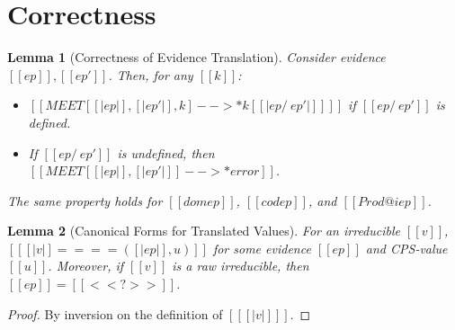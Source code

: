 \documentclass[11pt]{article}
\newtheorem{lemma}{Lemma}[section]
\begin{document}
\section{Correctness}

\begin{lemma}[Correctness of Evidence Translation]
	\label{lem:ev-correct}
	Consider evidence $[[ep]],[[ep']]$. Then, for any $[[k]]$:
	\begin{itemize}
		\item $[[MEET[ [|ep|], [|ep'|], k ] -->* k[ [| ep /\ ep' |] ] ]]$ if $[[ep /\ ep']]$ is defined.
		\item If $[[ep /\ ep']]$ is undefined, then $[[MEET[ [|ep|], [|ep'|] ] -->* error ]]$.
	\end{itemize}
	The same property holds for $[[dom ep]]$, $[[cod ep]]$, and $[[Prod@i ep]]$. 
\end{lemma}

\begin{lemma}[Canonical Forms for Translated Values]
	\label{lem:canonical-trans}
	For an irreducible $[[v]]$, $[[ [|v|] ==== ( [|ep|], u) ]] $ for some evidence $[[ep]]$ and CPS-value $[[u]]$.
	Moreover, if $[[v]]$ is a raw irreducible, then $[[ep]]=[[<<?>>]]$.
\end{lemma}
\begin{proof}
	By inversion on the definition of $[[ [|v|] ]]$.
\end{proof}
\end{document}
